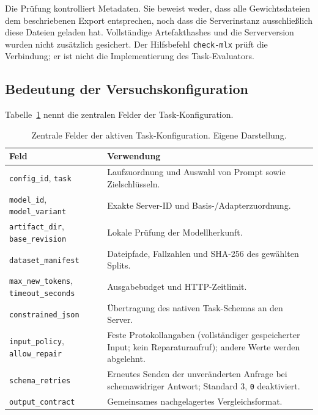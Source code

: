 \documentclass[12pt,twoside=false,a4paper,parskip]{scrbook}
\begin{document}
Die Prüfung kontrolliert Metadaten. Sie beweist weder, dass alle Gewichtsdateien dem beschriebenen Export entsprechen, noch dass die Serverinstanz ausschließlich diese Dateien geladen hat. Vollständige Artefakthashes und die Serverversion wurden nicht zusätzlich gesichert. Der Hilfsbefehl \texttt{check-mlx} prüft die Verbindung; er ist nicht die Implementierung des Task-Evaluators.

\subsection{Bedeutung der Versuchskonfiguration}\label{sec:konfiguration-anfrage}

Tabelle~\ref{tab:konfigurationsfelder} nennt die zentralen Felder der Task-Konfiguration.

\begin{table}[htbp]
\centering\small
\caption{Zentrale Felder der aktiven Task-Konfiguration. Eigene Darstellung.}
\label{tab:konfigurationsfelder}
\begin{tabular}{p{}p{}}
\toprule Feld & Verwendung \\\midrule
\texttt{config\_id}, \texttt{task} & Laufzuordnung und Auswahl von Prompt sowie Zielschlüsseln. \\
\texttt{model\_id}, \texttt{model\_variant} & Exakte Server-ID und Basis-/Adapterzuordnung. \\
\texttt{artifact\_dir}, \texttt{base\_revision} & Lokale Prüfung der Modellherkunft. \\
\texttt{dataset\_manifest} & Dateipfade, Fallzahlen und SHA-256 des gewählten Splits. \\
\texttt{max\_new\_tokens}, \texttt{timeout\_seconds} & Ausgabebudget und HTTP-Zeitlimit. \\
\texttt{constrained\_json} & Übertragung des nativen Task-Schemas an den Server. \\
\texttt{input\_policy}, \texttt{allow\_repair} & Feste Protokollangaben (vollständiger gespeicherter Input; kein Reparaturaufruf); andere Werte werden abgelehnt. \\
\texttt{schema\_retries} & Erneutes Senden der unveränderten Anfrage bei schemawidriger Antwort; Standard 3, \texttt{0} deaktiviert. \\
\texttt{output\_contract} & Gemeinsames nachgelagertes Vergleichsformat. \\
\bottomrule
\end{tabular}
\end{table}
\end{document}

